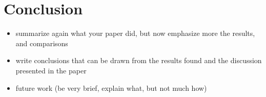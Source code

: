 \chapter{Conclusion}
\begin{itemize}
	\item summarize again what your paper did, but now emphasize more the results, and comparisons
	\item write conclusions that can be drawn from the results found and the discussion presented in the paper
	\item future work (be very brief, explain what, but not much how)
\end{itemize}